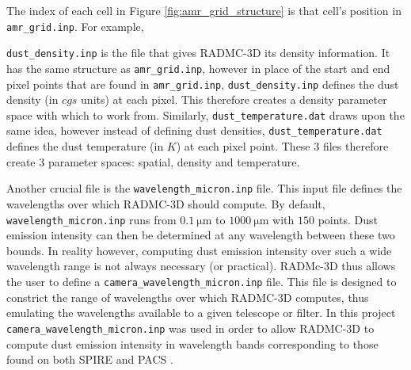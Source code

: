 \documentclass{report}
\begin{document}
The index of each cell in Figure \ref{fig:amr_grid_structure} is that cell's position in \texttt{amr\_grid.inp}. For example,

\texttt{dust\_density.inp} is the file that gives RADMC-3D its density information. It has the same structure as \texttt{amr\_grid.inp}, however in place of the start and end pixel points that are found in \texttt{amr\_grid.inp}, \texttt{dust\_density.inp} defines the dust density (in $cgs$ units) at each pixel. This therefore creates a density parameter space with which to work from. Similarly, \texttt{dust\_temperature.dat} draws upon the same idea, however instead of defining dust densities, \texttt{dust\_temperature.dat} defines the dust temperature (in $K$) at each pixel point. These 3 files therefore create 3 parameter spaces: spatial, density and temperature.

Another crucial file is the \texttt{wavelength\_micron.inp} file. This input file defines the wavelengths over which RADMC-3D should compute. By default, \texttt{wavelength\_micron.inp} runs from $\SI{0.1}{\micro\meter}$ to $\SI{1000}{\micro\meter}$ with $150$ points. Dust emission intensity can then be determined at any wavelength between these two bounds. In reality however, computing dust emission intensity over such a wide wavelength range is not always necessary (or practical). RADMc-3D thus allows the user to define a \texttt{camera\_wavelength\_micron.inp} file. This file is designed to constrict the range of wavelengths over which RADMC-3D computes, thus emulating the wavelengths available to a given telescope or filter. In this project \texttt{camera\_wavelength\_micron.inp} was used in order to allow RADMC-3D to compute dust emission intensity in wavelength bands corresponding to those found on both SPIRE \parencite{SPIRE} and PACS \parencite{PACS}.
\end{document}
